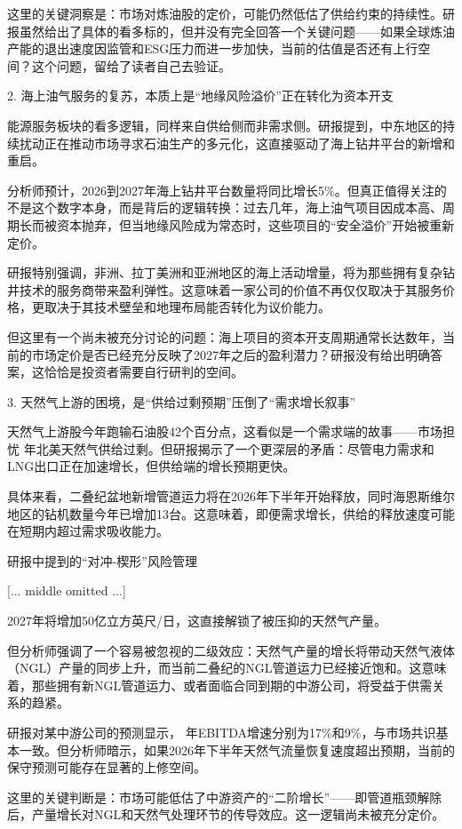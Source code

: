 \documentclass[11pt]{ctexart}
\begin{document}
这里的关键洞察是：市场对炼油股的定价，可能仍然低估了供给约束的持续性。研报虽然给出了具体的看多标的，但并没有完全回答一个关键问题——如果全球炼油产能的退出速度因监管和ESG压力而进一步加快，当前的估值是否还有上行空间？这个问题，留给了读者自己去验证。

2. 海上油气服务的复苏，本质上是“地缘风险溢价”正在转化为资本开支

能源服务板块的看多逻辑，同样来自供给侧而非需求侧。研报提到，中东地区的持续扰动正在推动市场寻求石油生产的多元化，这直接驱动了海上钻井平台的新增和重启。

分析师预计，2026到2027年海上钻井平台数量将同比增长5\%。但真正值得关注的不是这个数字本身，而是背后的逻辑转换：过去几年，海上油气项目因成本高、周期长而被资本抛弃，但当地缘风险成为常态时，这些项目的“安全溢价”开始被重新定价。

研报特别强调，非洲、拉丁美洲和亚洲地区的海上活动增量，将为那些拥有复杂钻井技术的服务商带来盈利弹性。这意味着一家公司的价值不再仅仅取决于其服务价格，更取决于其技术壁垒和地理布局能否转化为议价能力。

但这里有一个尚未被充分讨论的问题：海上项目的资本开支周期通常长达数年，当前的市场定价是否已经充分反映了2027年之后的盈利潜力？研报没有给出明确答案，这恰恰是投资者需要自行研判的空间。

3. 天然气上游的困境，是“供给过剩预期”压倒了“需求增长叙事”

天然气上游股今年跑输石油股42个百分点，这看似是一个需求端的故事——市场担忧 年北美天然气供给过剩。但研报揭示了一个更深层的矛盾：尽管电力需求和LNG出口正在加速增长，但供给端的增长预期更快。

具体来看，二叠纪盆地新增管道运力将在2026年下半年开始释放，同时海恩斯维尔地区的钻机数量今年已增加13台。这意味着，即便需求增长，供给的释放速度可能在短期内超过需求吸收能力。

研报中提到的“对冲-楔形”风险管理

[... middle omitted ...]

2027年将增加50亿立方英尺/日，这直接解锁了被压抑的天然气产量。

但分析师强调了一个容易被忽视的二级效应：天然气产量的增长将带动天然气液体（NGL）产量的同步上升，而当前二叠纪的NGL管道运力已经接近饱和。这意味着，那些拥有新NGL管道运力、或者面临合同到期的中游公司，将受益于供需关系的趋紧。

研报对某中游公司的预测显示， 年EBITDA增速分别为17\%和9\%，与市场共识基本一致。但分析师暗示，如果2026年下半年天然气流量恢复速度超出预期，当前的保守预测可能存在显著的上修空间。

这里的关键判断是：市场可能低估了中游资产的“二阶增长”——即管道瓶颈解除后，产量增长对NGL和天然气处理环节的传导效应。这一逻辑尚未被充分定价。
\end{document}
